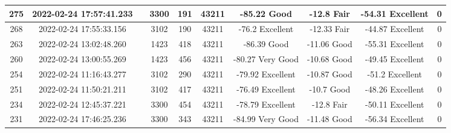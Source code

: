 \begin{longtable*}{|c|c|c|c|c|c|c|c|c|c|}
275&2022-02-24 17:57:41.233&&3300&191&43211& -85.22    Good        & -12.8     Fair        & -54.31    Excellent   & 0\\\hline
{}268&2022-02-24 17:55:33.156&&3102&190&43211& -76.2     Excellent   & -12.33    Fair        & -44.87    Excellent   & 0\\\hline
{}263&2022-02-24 13:02:48.260&&1423&418&43211& -86.39    Good        & -11.06    Good        & -55.31    Excellent   & 0\\\hline
{}260&2022-02-24 13:00:55.269&&1423&456&43211& -80.27    Very Good   & -10.68    Good        & -49.45    Excellent   & 0\\\hline
{}254&2022-02-24 11:16:43.277&&3102&290&43211& -79.92    Excellent   & -10.87    Good        & -51.2     Excellent   & 0\\\hline
{}251&2022-02-24 11:50:21.211&&3102&417&43211& -76.49    Excellent   & -10.7     Good        & -48.26    Excellent   & 0\\\hline
{}234&2022-02-24 12:45:37.221&&3300&454&43211& -78.79    Excellent   & -12.8     Fair        & -50.11    Excellent   & 0\\\hline
{}231&2022-02-24 17:46:25.236&&3300&343&43211& -84.99    Very Good   & -11.48    Good        & -56.34    Excellent   & 0\\\hline

\end{longtable*}
